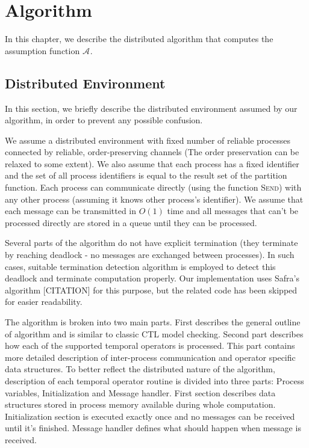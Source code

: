 \documentclass[12pt,oneside,draft]{fithesis2}
\newcommand{\as}[1][]{\ensuremath{\mathcal{A}_{#1}}}
\newcommand{\method}[1]{\textnormal{\textsc{#1}}}
\begin{document}
			
		
		
    \chapter{Algorithm}
    
    	In this chapter, we describe the distributed algorithm that computes the assumption function $\as$. 
    	
    	\section{Distributed Environment}
    	
		In this section, we briefly describe the distributed environment assumed by our algorithm, in order to prevent any possible confusion.
		
		We assume a distributed environment with fixed number of reliable processes connected by reliable, order-preserving channels (The order preservation can be relaxed to some extent). We also assume that each process has a fixed identifier and the set of all process identifiers is equal to the result set of the partition function. Each process can communicate directly (using the function \method{Send}) with any other process (assuming it knows other process's identifier). We assume that each message can be transmitted in $O(1)$ time and all messages that can't be processed directly are stored in a queue until they can be processed.		
		
		Several parts of the algorithm do not have explicit termination (they terminate by reaching deadlock - no messages are exchanged between processes). In such cases, suitable termination detection algorithm is employed to detect this deadlock and terminate computation properly. Our implementation uses Safra's algorithm [CITATION] for this purpose, but the related code has been skipped for easier readability.
    	
		The algorithm is broken into two main parts. First describes the general outline of algorithm and is similar to classic CTL model checking. Second part describes how each of the supported temporal operators is processed. This part contains more detailed description of inter-process communication and operator specific data structures. To better reflect the distributed nature of the algorithm, description of each temporal operator routine is divided into three parts: Process variables, Initialization and Message handler. First section describes data structures stored in process memory available during whole computation. Initialization section is executed exactly once and no messages can be received until it's finished. Message handler defines what should happen when message is received.  
		
\end{document}
